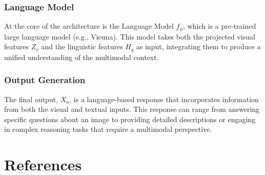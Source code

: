 \documentclass[12pt, conference, compsoc, onecolumn]{IEEEtran}
\begin{document}
	\subsubsection*{Language Model}
	At the core of the architecture is the Language Model $f_\phi$, which is a pre-trained large language model (e.g., Vicuna). This model takes both the projected visual features $Z_v$ and the linguistic features $H_q$ as input, integrating them to produce a unified understanding of the multimodal context.
	
	\subsubsection*{Output Generation}
	The final output, $X_a$, is a language-based response that incorporates information from both the visual and textual inputs. This response can range from answering specific questions about an image to providing detailed descriptions or engaging in complex reasoning tasks that require a multimodal perspective.
	
	
	\section*{References}
	\nocite{*}
	\printbibliography[heading=none]
	
	
	
\end{document}
